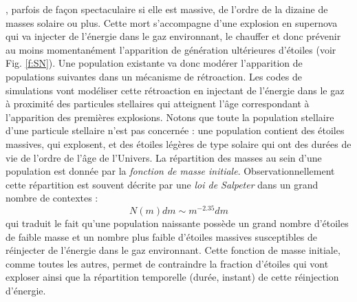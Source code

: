 , parfois de façon spectaculaire si elle est massive, de l'ordre de la dizaine de masses solaire ou plus. Cette mort s'accompagne d'une explosion en supernova qui va injecter de l'énergie dans le gaz environnant, le chauffer et donc prévenir au moins momentanément l'apparition de génération ultérieures d'étoiles (voir Fig. \ref{f:SN}). Une population existante va donc modérer l'apparition de populations suivantes dans un mécanisme de rétroaction. Les codes de simulations vont modéliser cette rétroaction en injectant de l'énergie dans le gaz à proximité des particules stellaires qui atteignent l'âge correspondant à l'apparition des premières explosions. Notons que toute la population stellaire d'une particule stellaire n'est pas concernée : une population contient des étoiles massives, qui explosent, et des étoiles légères de type solaire qui ont des durées de vie de l'ordre de l'âge de l'Univers. La répartition des masses au sein d'une population est donnée par la \textit{fonction de masse initiale}. Observationnellement cette répartition est souvent décrite par une \textit{loi de Salpeter} dans un grand nombre de contextes :
\begin{equation}
N(m)dm\sim m^{-2.35}dm
\end{equation}
qui traduit le fait qu'une population naissante possède un grand nombre d'étoiles de faible masse et un nombre plus faible d'étoiles massives susceptibles de réinjecter de l'énergie dans le gaz environnant. Cette fonction de masse initiale, comme toutes les autres, permet de contraindre la fraction d'étoiles qui vont exploser ainsi que la répartition temporelle (durée, instant) de cette réinjection d'énergie.

